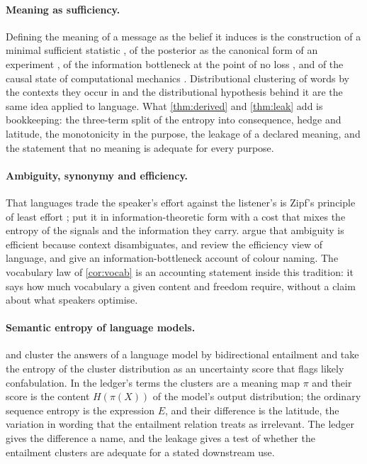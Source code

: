 \paragraph{Meaning as sufficiency.} Defining the meaning of a message as the belief it induces is the construction of a minimal sufficient statistic \citep{fisher1922}, of the posterior as the canonical form of an experiment \citep{blackwell1953}, of the information bottleneck at the point of no loss \citep{tishby2000}, and of the causal state of computational mechanics \citep{shalizi2001}. Distributional clustering of words by the contexts they occur in \citep{pereira1993} and the distributional hypothesis behind it \citep{harris1954,firth1957} are the same idea applied to language. What \cref{thm:derived} and \cref{thm:leak} add is bookkeeping: the three-term split of the entropy into consequence, hedge and latitude, the monotonicity in the purpose, the leakage of a declared meaning, and the statement that no meaning is adequate for every purpose.

\paragraph{Ambiguity, synonymy and efficiency.} That languages trade the speaker's effort against the listener's is Zipf's principle of least effort \citep{zipf1949}; \citet{ferrer2003} put it in information-theoretic form with a cost that mixes the entropy of the signals and the information they carry. \citet{piantadosi2012} argue that ambiguity is efficient because context disambiguates, and \citet{gibson2019} review the efficiency view of language, and \citet{zaslavsky2018} give an information-bottleneck account of colour naming. The vocabulary law of \cref{cor:vocab} is an accounting statement inside this tradition: it says how much vocabulary a given content and freedom require, without a claim about what speakers optimise.

\paragraph{Semantic entropy of language models.} \citet{kuhn2023} and \citet{farquhar2024} cluster the answers of a language model by bidirectional entailment and take the entropy of the cluster distribution as an uncertainty score that flags likely confabulation. In the ledger's terms the clusters are a meaning map $\pi$ and their score is the content $H(\pi(X))$ of the model's output distribution; the ordinary sequence entropy is the expression $E$, and their difference is the latitude, the variation in wording that the entailment relation treats as irrelevant. The ledger gives the difference a name, and the leakage gives a test of whether the entailment clusters are adequate for a stated downstream use.

